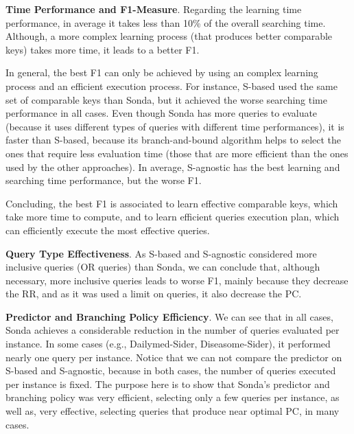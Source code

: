 \textbf{Time Performance and F1-Measure}. Regarding the learning time performance, in average it takes less than 10\% of the overall searching time. Although, a more complex learning process (that produces better comparable keys) takes more time, it leads to a better F1. 

In general, the best F1 can only be achieved by using an complex learning process and an efficient execution process. For instance, S-based used the same set of comparable keys than Sonda, but it achieved the worse searching time performance in all cases. Even though Sonda has more queries to evaluate (because it uses different types of queries with different time performances), it is faster than S-based, because its  branch-and-bound algorithm helps to select the ones that require less evaluation time (those that are more efficient than the ones used by the other approaches).  In average, S-agnostic has the best learning and searching time performance, but the worse F1. 

Concluding, the best F1 is associated to learn effective comparable keys, which take more time to compute, and to learn efficient queries execution plan, which can efficiently execute the most effective queries. 
 
\textbf{Query Type Effectiveness}. As S-based and S-agnostic considered more inclusive queries (OR queries) than Sonda, we can conclude that, although necessary, more inclusive queries leads to worse F1, mainly because they decrease the RR, and as it was used a limit on queries, it also decrease the PC. 

\textbf{Predictor and Branching Policy Efficiency}. We can see that in all cases, Sonda achieves a considerable reduction in the number of queries evaluated per instance. In some cases (e.g., Dailymed-Sider, Diseasome-Sider), it performed nearly one query per instance. Notice that we can not compare the predictor on S-based and S-agnostic, because in both cases, the number of queries executed per instance is fixed. The purpose here is to show  that Sonda's predictor and branching policy was very efficient, selecting only a few queries per instance, as well as, very effective, selecting queries that produce near optimal PC, in many cases. 


